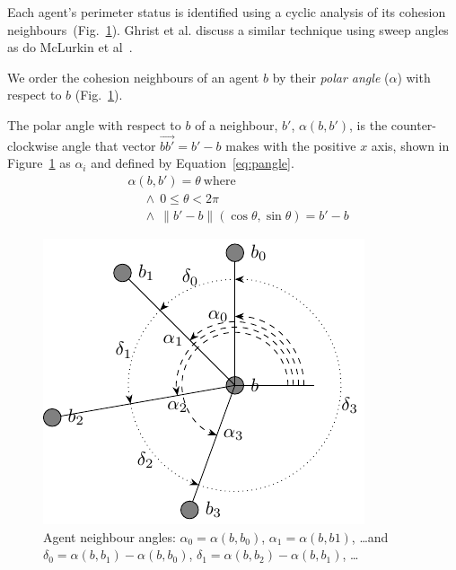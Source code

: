 \documentclass[12pt,a4paper]{IEEEtran}
\newcommand{\vbb}[2]{#2-#1}
\newcommand{\pangle}{\mathit{\alpha}}
\begin{document}
Each agent's perimeter status is identified using a cyclic analysis of its
cohesion neighbours~(Fig.~\ref{fig:neighbours3}). Ghrist
et al. discuss a similar technique using sweep
angles~\cite{ghrist2008surrounding} as do McLurkin et al~\cite{mclurkin2009}. 

We order the cohesion neighbours of an agent $b$ by their \emph{polar
angle} ($\alpha$) with respect to $b$ (Fig.~\ref{fig:neighbours3}). 

The polar angle with respect to $b$ of a neighbour, $b'$, $\pangle(b, b')$, is
the counter-clockwise angle that vector $\vec{bb'} = b' - b$ makes with the
positive $x$ axis, shown in Figure~\ref{fig:neighbours3} as $\alpha_i$ and
defined by Equation~\ref{eq:pangle}.
\begin{align}\label{eq:pangle}
	& \pangle(b, b') = \theta~\mathrm{where}   \nonumber \\
	&		\quad~\land~0 \leq \theta < 2\pi \nonumber \\
	&   \quad~\land~\|b'-b\|(\cos\theta,\sin\theta) = b'- b 
\end{align} 
\begin{figure}[H]
	\centering
	\includegraphics[width=0.8\linewidth]{figures/neighbours3}
	\caption[Agent neighbours]{Agent neighbour angles: {\small
	 $\alpha_0 = \pangle(b, b_0)$, $\alpha_1 = \pangle(b, b1)$, \ldots and
	 $\delta_0 = \pangle(b, b_1) - \pangle(b, b_0)$, $\delta_1 = \pangle(b, b_2) - \pangle(b, b_1)$, \ldots}}
	\label{fig:neighbours3}
\end{figure}
\end{document}
